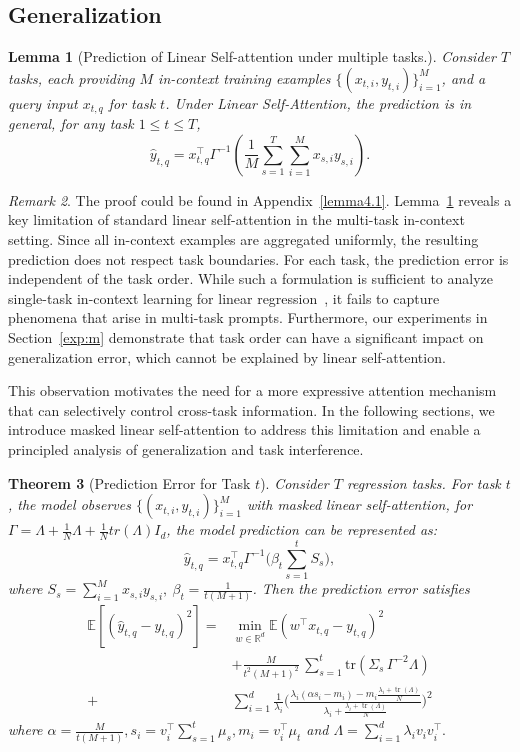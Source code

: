 \documentclass{article}
\theoremstyle{plain}
\newtheorem{theorem}{Theorem}[section]
\newtheorem{lemma}[theorem]{Lemma}
\theoremstyle{definition}
\theoremstyle{remark}
\newtheorem{remark}[theorem]{Remark}
\begin{document}
\subsection{Generalization}
\label{4.1}
\begin{lemma}[Prediction of Linear Self-attention under multiple tasks.]
\label{prediction}
Consider $T$ tasks, each providing $M$ in-context training examples 
$\{(x_{t,i},y_{t,i})\}_{i=1}^M$, and a query input $x_{t,q}$ for task $t$.  
Under Linear Self-Attention, the prediction is in general, for any task $1\le t\le T$,
\[
\hat{y}_{t,q}
=
x_{t,q}^\top\Gamma^{-1}
\left(
\frac{1}{M}\sum_{s=1}^T\sum_{i=1}^M x_{s,i}y_{s,i}
\right).
\]
\end{lemma}
\begin{remark}
The proof could be found in Appendix~\ref{lemma4.1}. Lemma~\ref{prediction} reveals a key limitation of standard linear self-attention in the multi-task in-context setting. Since all in-context examples are aggregated uniformly, the resulting prediction does not respect task boundaries. For each task, the prediction error is independent of the task order. While such a formulation is sufficient to analyze single-task in-context learning for linear regression~\citep{pmlr-v202-li23l,ahn2023transformers,zhang2024trained}, it fails to capture phenomena that arise in multi-task prompts. Furthermore, our experiments in Section~\ref{exp:m} demonstrate that task order can have a significant impact on generalization error, which cannot be explained by linear self-attention.
\end{remark}

This observation motivates the need for a more expressive attention mechanism that can selectively control cross-task information. In the following sections, we introduce masked linear self-attention to address this limitation and enable a principled analysis of generalization and task interference.
\begin{theorem}[Prediction Error for Task $t$]
\label{thm-generalization}
Consider $T$ regression tasks. For task $t$, the model observes $\{(x_{t,i},y_{t,i})\}_{i=1}^M$ with masked linear self-attention, for $\Gamma = \Lambda + \frac{1}{N}\Lambda + \frac{1}{N}tr(\Lambda)I_d$, the model prediction can be represented as:
\[
\hat{y}_{t,q}
= x_{t,q}^\top\Gamma^{-1}
\Big(\beta_{t}\sum_{s=1}^t S_s\Big),
\]
where $S_s=\sum_{i=1}^M x_{s,i}y_{s,i},\:\beta_{t}=\frac{1}{t(M+1)}$. Then the prediction error satisfies
\[
\begin{aligned}
\mathbb{E}[(\hat y_{t,q}-y_{t,q})^2]
=&\min_{w\in\mathbb{R}^d} \mathbb{E}(w^\top x_{t,q} - y_{t,q})^2 \\&+\frac{M}{t^2(M+1)^2}\,\sum_{s=1}^t\mathrm{tr}(\Sigma_s\,\Gamma^{-2}\Lambda)\\
+&\sum_{i=1}^d \frac{1}{\lambda_i}\Big(\frac{\lambda_i(\alpha s_i - m_i) - m_i\frac{\lambda_i + \operatorname{tr}(\Lambda)}{N}}{\lambda_i + \frac{\lambda_i + \operatorname{tr}(\Lambda)}{N}} \Big)^2
\end{aligned}
\]
where $\alpha=\frac{M}{t(M+1)},s_i = v_i^\top\sum_{s=1}^t\mu_s,m_i = v_i^\top\mu_t$ and $ \Lambda =\sum_{i=1}^d\lambda_i v_iv_i^\top.$
\end{theorem}
\end{document}
